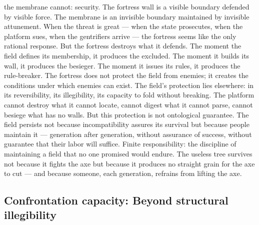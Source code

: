 the membrane cannot: security. The fortress wall is a visible boundary defended by visible force. The membrane is an invisible boundary maintained by invisible attunement. When the threat is great — when the state prosecutes, when the platform sues, when the gentrifiers arrive — the fortress seems like the only rational response. But the fortress destroys what it defends. The moment the field defines its membership, it produces the excluded. The moment it builds its wall, it produces the besieger. The moment it issues its rules, it produces the rule-breaker. The fortress does not protect the field from enemies; it creates the conditions under which enemies can exist. The field’s protection lies elsewhere: in its reversibility, its illegibility, its capacity to fold without breaking. The platform cannot destroy what it cannot locate, cannot digest what it cannot parse, cannot besiege what has no walls. But this protection is not ontological guarantee. The field persists not because incompatibility assures its survival but because people maintain it — generation after generation, without assurance of success, without guarantee that their labor will suffice. Finite responsibility: the discipline of maintaining a field that no one promised would endure. The useless tree survives not because it fights the axe but because it produces no straight grain for the axe to cut — and because someone, each generation, refrains from lifting the axe.

\subsection{Confrontation capacity: Beyond structural illegibility}

